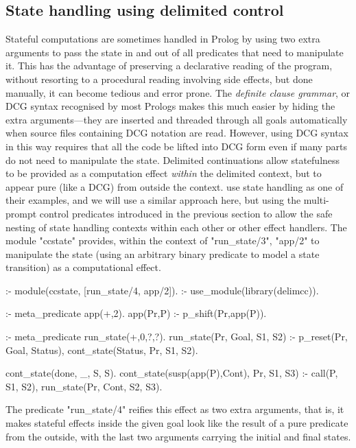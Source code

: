 \subsection{State handling using delimited control}
\label{sec:ccstate}

Stateful computations are sometimes handled in Prolog by using two extra arguments to pass the state in and out
of all predicates that need to manipulate it. This has the advantage of preserving a  
declarative reading of the program, without resorting to a procedural reading involving side effects, but done 
manually, it can become tedious and
error prone. The \emph{definite clause grammar}, or DCG syntax \cite{PereiraWarren1980}
recognised by most Prologs makes this much easier by hiding the extra arguments---they are inserted and
threaded through all goals automatically when source files containing DCG notation
are read. However, using DCG syntax in this way requires that all the code be lifted into DCG form
even if many parts do not need to manipulate the state. Delimited continuations allow statefulness
to be provided as a computation effect \emph{within} the delimited context, but to appear pure
(like a DCG) from outside the context. \cite{SchrijversDemoenDesouter2013} use state handling
as one of their examples, and we will use a similar approach here, but using the multi-prompt
control predicates introduced in the previous section to allow the safe nesting of state handling
contexts within each other or other effect handlers. The module "ccstate" provides,
within the context of "run_state/3", "app/2" to manipulate the state (using an arbitrary binary predicate
to model a state transition) as a computational effect.
\begin{prolog-framed}[name=ccstate]
  :- module(ccstate, [run_state/4, app/2]).
  :- use_module(library(delimcc)).

  :- meta_predicate app(+,2).
  app(Pr,P)  :- p_shift(Pr,app(P)).

  :- meta_predicate run_state(+,0,?,?).
  run_state(Pr, Goal, S1, S2) :- 
     p_reset(Pr, Goal, Status), 
     cont_state(Status, Pr, S1, S2).

  cont_state(done, _, S, S).
  cont_state(susp(app(P),Cont), Pr, S1, S3) :- 
    call(P, S1, S2), 
    run_state(Pr, Cont, S2, S3).
\end{prolog-framed}
The predicate "run_state/4" reifies this effect
as two extra arguments, that is, it makes stateful effects inside the given goal look like the result
of a pure predicate from the outside, with the last two arguments carrying the initial and final
states.

